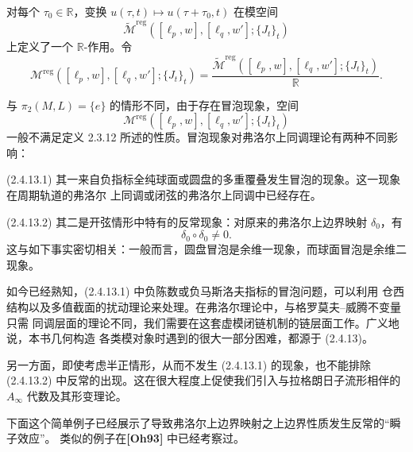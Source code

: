 对每个 $\tau_0\in\mathbb R$，变换
$u(\tau,t)\mapsto u(\tau+\tau_0,t)$ 在模空间
\[
  \widetilde{\mathcal M}^{\mathrm{reg}}
  ([\ell_p,w],[\ell_q,w'];\{J_t\}_t)
\]
上定义了一个 $\mathbb R$-作用。令
\begin{equation}
  \mathcal M^{\mathrm{reg}}
  ([\ell_p,w],[\ell_q,w'];\{J_t\}_t)
  =\frac{
    \widetilde{\mathcal M}^{\mathrm{reg}}
    ([\ell_p,w],[\ell_q,w'];\{J_t\}_t)
  }{\mathbb R}.
  \tag{2.4.12}\label{eq:2-4-12}
\end{equation}

与 $\pi_2(M,L)=\{e\}$ 的情形不同，由于存在冒泡现象，空间
\[
  \mathcal M^{\mathrm{reg}}
  ([\ell_p,w],[\ell_q,w'];\{J_t\}_t)
\]
一般不满足定义 2.3.12 所述的性质。冒泡现象对弗洛尔上同调理论有两种不同影响：

\par\smallskip\noindent\textup{(2.4.13.1)}\quad
其一来自负指标全纯球面或圆盘的多重覆叠发生冒泡的现象。这一现象在周期轨道的弗洛尔
上同调或闭弦的弗洛尔上同调中已经存在。

\par\smallskip\noindent\textup{(2.4.13.2)}\quad
其二是开弦情形中特有的反常现象：对原来的弗洛尔上边界映射 $\delta_0$，有
\[
  \delta_0\circ\delta_0\neq0.
\]
这与如下事实密切相关：一般而言，圆盘冒泡是余维一现象，而球面冒泡是余维二现象。

如今已经熟知，(2.4.13.1) 中负陈数或负马斯洛夫指标的冒泡问题，可以利用
仓西结构以及多值截面的扰动理论来处理。在弗洛尔理论中，与格罗莫夫--威腾不变量只需
同调层面的理论不同，我们需要在这套虚模闭链机制的链层面工作。广义地说，本书几何构造
各类模对象时遇到的很大一部分困难，都源于 (2.4.13)。

另一方面，即使考虑半正情形，从而不发生 (2.4.13.1) 的现象，也不能排除
(2.4.13.2) 中反常的出现。这在很大程度上促使我们引入与拉格朗日子流形相伴的
$A_\infty$ 代数及其形变理论。

下面这个简单例子已经展示了导致弗洛尔上边界映射之上边界性质发生反常的“瞬子效应”。
类似的例子在\textbf{[Oh93]} 中已经考察过。

